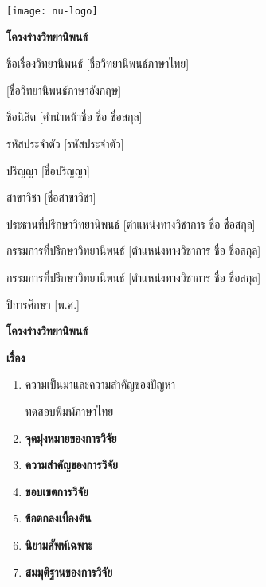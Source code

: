 \begin{titlepage}
  \begin{center}
    \texttt{[image: nu-logo]}
    
    \textbf{โครงร่างวิทยานิพนธ์}

    ชื่อเรื่องวิทยานิพนธ์	[ชื่อวิทยานิพนธ์ภาษาไทย]

    [ชื่อวิทยานิพนธ์ภาษาอังกฤษ]

    ชื่อนิสิต	[คำนำหน้าชื่อ ชื่อ ชื่อสกุล]

    รหัสประจำตัว	[รหัสประจำตัว]

    ปริญญา	[ชื่อปริญญา]

    สาขาวิชา	[ชื่อสาขาวิชา]

    ประธานที่ปรึกษาวิทยานิพนธ์	[ตำแหน่งทางวิชาการ ชื่อ ชื่อสกุล]

    กรรมการที่ปรึกษาวิทยานิพนธ์	[ตำแหน่งทางวิชาการ ชื่อ ชื่อสกุล]

    กรรมการที่ปรึกษาวิทยานิพนธ์	[ตำแหน่งทางวิชาการ ชื่อ ชื่อสกุล]

    ปีการศึกษา	[พ.ศ.]
  \end{center}
  \newpage

  \centering\textbf{โครงร่างวิทยานิพนธ์}

  \raggedright\textbf{เรื่อง}

  \begin{enumerate}
    \item{ความเป็นมาและความสำคัญของปัญหา}
    
    ทดสอบพิมพ์ภาษาไทย
    \lipsum[1-3]

    \item\textbf{จุดมุ่งหมายของการวิจัย}
    
    \lipsum[1-1]

    \item\textbf{ความสำคัญของการวิจัย}
    
    \lipsum[1-1]

    \item\textbf{ขอบเขตการวิจัย}
    
    \lipsum[1-1]

    \item\textbf{ข้อตกลงเบื้องต้น}
    
    \lipsum[1-1]

    \item\textbf{นิยามศัพท์เฉพาะ}
    
    \lipsum[1-1]

    \item\textbf{สมมุติฐานของการวิจัย}
    

\end{enumerate}
\end{titlepage}
